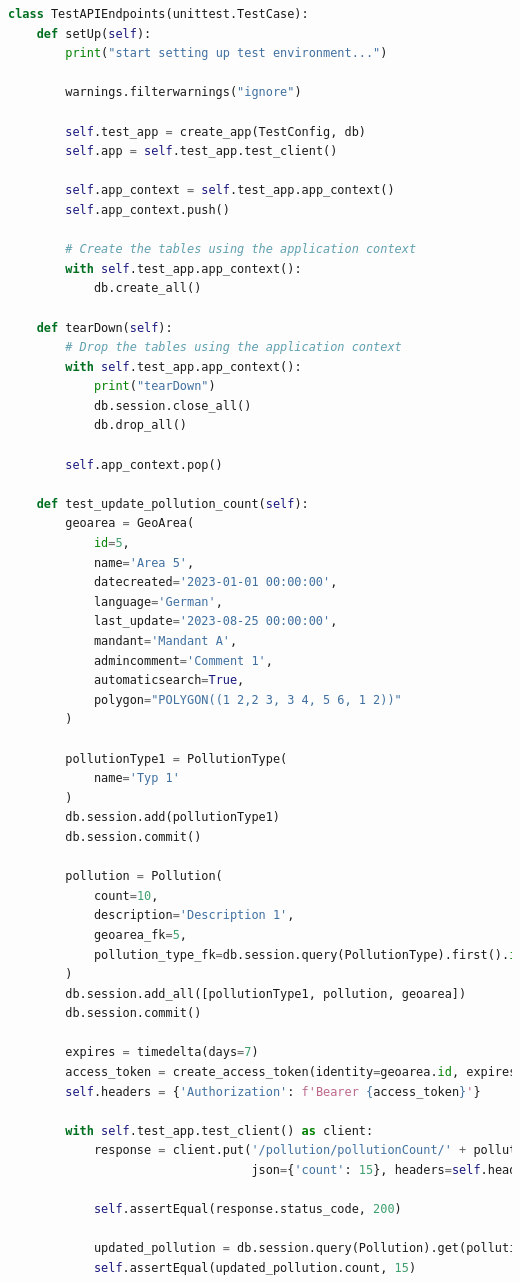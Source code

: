 \documentclass[a4paper,12pt]{article}
\begin{document}
\begin{lstlisting}[language=Python, caption=Implementation der Integrationstests , label=lst:integrationtest]
class TestAPIEndpoints(unittest.TestCase):
    def setUp(self):
        print("start setting up test environment...")

        warnings.filterwarnings("ignore")

        self.test_app = create_app(TestConfig, db)
        self.app = self.test_app.test_client()

        self.app_context = self.test_app.app_context()
        self.app_context.push()

        # Create the tables using the application context
        with self.test_app.app_context():
            db.create_all()

    def tearDown(self):
        # Drop the tables using the application context
        with self.test_app.app_context():
            print("tearDown")
            db.session.close_all()
            db.drop_all()

        self.app_context.pop()

    def test_update_pollution_count(self):
        geoarea = GeoArea(
            id=5,
            name='Area 5',
            datecreated='2023-01-01 00:00:00',
            language='German',
            last_update='2023-08-25 00:00:00',
            mandant='Mandant A',
            admincomment='Comment 1',
            automaticsearch=True,
            polygon="POLYGON((1 2,2 3, 3 4, 5 6, 1 2))"
        )

        pollutionType1 = PollutionType(
            name='Typ 1'
        )
        db.session.add(pollutionType1)
        db.session.commit()

        pollution = Pollution(
            count=10,
            description='Description 1',
            geoarea_fk=5,
            pollution_type_fk=db.session.query(PollutionType).first().id
        )
        db.session.add_all([pollutionType1, pollution, geoarea])
        db.session.commit()

        expires = timedelta(days=7)
        access_token = create_access_token(identity=geoarea.id, expires_delta=expires)
        self.headers = {'Authorization': f'Bearer {access_token}'}

        with self.test_app.test_client() as client:
            response = client.put('/pollution/pollutionCount/' + pollution.id,
                                  json={'count': 15}, headers=self.headers)

            self.assertEqual(response.status_code, 200)

            updated_pollution = db.session.query(Pollution).get(pollution.id)
            self.assertEqual(updated_pollution.count, 15)
\end{lstlisting}
\end{document}
